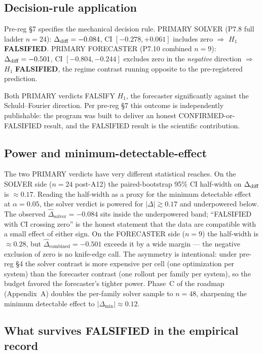\subsection{Decision-rule application}
\label{sec:verdict-decision}

Pre-reg \S7 specifies the mechanical decision rule. PRIMARY SOLVER
(P7.8 full ladder $n=24$): $\Delta_{\mathrm{diff}} = -0.084$, CI $[-0.278, +0.061]$
includes zero $\Rightarrow$ $H_1$ \textbf{FALSIFIED}. PRIMARY
FORECASTER (P7.10 combined $n=9$): $\Delta_{\mathrm{diff}} = -0.501$, CI $[-0.804,
-0.244]$ excludes zero in the \emph{negative} direction $\Rightarrow$
$H_1$ \textbf{FALSIFIED}, the regime contrast running opposite to the
pre-registered prediction.

Both PRIMARY verdicts FALSIFY $H_1$, the forecaster significantly
against the Schuld--Fourier direction. Per pre-reg \S7 this outcome
is independently publishable: the program was built to deliver an
honest CONFIRMED-or-FALSIFIED result, and the FALSIFIED result is the
scientific contribution.

\subsection{Power and minimum-detectable-effect}
\label{sec:verdict-power}

The two PRIMARY verdicts have very different statistical reaches.
On the SOLVER side ($n=24$ post-A12) the paired-bootstrap 95\% CI
half-width on $\Delta_{\mathrm{diff}}$ is $\approx 0.17$. Reading the half-width as a
proxy for the minimum detectable effect at $\alpha = 0.05$, the
solver verdict is powered for $|\Delta| \gtrsim 0.17$ and
underpowered below. The observed $\hat{\Delta}_{\text{solver}} =
-0.084$ sits inside the underpowered band; ``FALSIFIED with CI
crossing zero'' is the honest statement that the data are compatible
with a small effect of either sign. On the FORECASTER side ($n=9$)
the half-width is $\approx 0.28$, but $\hat{\Delta}_{\text{combined}}
= -0.501$ exceeds it by a wide margin --- the negative exclusion of
zero is no knife-edge call. The asymmetry is intentional: under
pre-reg \S 4 the solver contrast is more expensive per cell (one
optimization per system) than the forecaster contrast (one rollout
per family per system), so the budget favored the forecaster's
tighter power. Phase~C of the roadmap (Appendix~A) doubles the
per-family solver sample to $n=48$, sharpening the minimum detectable
effect to $|\Delta_{\min}| \approx 0.12$.

\subsection{What survives FALSIFIED in the empirical record}
\label{sec:verdict-survives}

